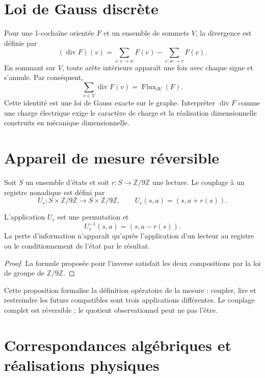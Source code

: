 \section{Loi de Gauss discrète}

Pour une 1-cochaîne orientée \(F\) et un ensemble de sommets \(V\), la
divergence est définie par
\[
 (\operatorname{div}F)(v)=
 \sum_{e:v\to w}F(e)-\sum_{e:w\to v}F(e).
\]
En sommant sur \(V\), toute arête intérieure apparaît une fois avec chaque signe et
s’annule. Par conséquent,
\[
 \boxed{
 \sum_{v\in V}\operatorname{div}F(v)
 =\operatorname{Flux}_{\partial V}(F).}
\]
Cette identité est une loi de Gauss exacte sur le graphe. Interpréter
\(\operatorname{div}F\) comme une charge électrique exige le caractère de charge et la
réalisation dimensionnelle construits en mécanique dimensionnelle.

\section{Appareil de mesure réversible}

Soit \(S\) un ensemble d’états et soit \(r:S\to\mathbb Z/9\mathbb Z\) une
lecture. Le couplage à un registre nonadique est défini par
\[
 U_r:S\times\mathbb Z/9\mathbb Z\longrightarrow
 S\times\mathbb Z/9\mathbb Z,
 \qquad
 U_r(s,a)=(s,a+r(s)).
\]

\begin{proposition}
L'application \(U_r\) est une permutation et
\[
 U_r^{-1}(s,a)=(s,a-r(s)).
\]
La perte d’information n’apparaît qu’après l’application d’un lecteur au
registre ou le conditionnement de l’état par le résultat.
\end{proposition}

\begin{proof}
La formule proposée pour l’inverse satisfait les deux compositions par la
loi de groupe de \(\mathbb Z/9\mathbb Z\).
\end{proof}

Cette proposition formalise la définition opératoire de la mesure : coupler,
lire et restreindre les futurs compatibles sont trois applications différentes. Le
couplage complet est réversible ; le quotient observationnel peut ne pas l’être.

\section{Correspondances algébriques et réalisations physiques}

